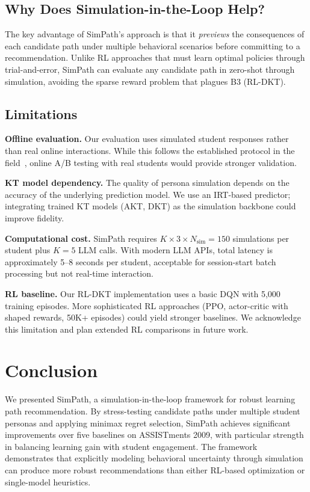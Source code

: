 \documentclass[runningheads]{llncs}
\begin{document}
\subsection{Why Does Simulation-in-the-Loop Help?}

The key advantage of SimPath's approach is that it \emph{previews} the consequences of each candidate path under multiple behavioral scenarios before committing to a recommendation.
Unlike RL approaches that must learn optimal policies through trial-and-error, SimPath can evaluate any candidate path in zero-shot through simulation, avoiding the sparse reward problem that plagues B3 (RL-DKT).

\subsection{Limitations}

\textbf{Offline evaluation.}
Our evaluation uses simulated student responses rather than real online interactions.
While this follows the established protocol in the field~\cite{cseal2019,src2023}, online A/B testing with real students would provide stronger validation.

\textbf{KT model dependency.}
The quality of persona simulation depends on the accuracy of the underlying prediction model.
We use an IRT-based predictor; integrating trained KT models (AKT, DKT) as the simulation backbone could improve fidelity.

\textbf{Computational cost.}
SimPath requires $K \times 3 \times N_{\text{sim}} = 150$ simulations per student plus $K=5$ LLM calls.
With modern LLM APIs, total latency is approximately 5--8 seconds per student, acceptable for session-start batch processing but not real-time interaction.

\textbf{RL baseline.}
Our RL-DKT implementation uses a basic DQN with 5,000 training episodes.
More sophisticated RL approaches (PPO, actor-critic with shaped rewards, 50K+ episodes) could yield stronger baselines.
We acknowledge this limitation and plan extended RL comparisons in future work.

\section{Conclusion}

We presented SimPath, a simulation-in-the-loop framework for robust learning path recommendation.
By stress-testing candidate paths under multiple student personas and applying minimax regret selection, SimPath achieves significant improvements over five baselines on ASSISTments 2009, with particular strength in balancing learning gain with student engagement.
The framework demonstrates that explicitly modeling behavioral uncertainty through simulation can produce more robust recommendations than either RL-based optimization or single-model heuristics.
\end{document}
